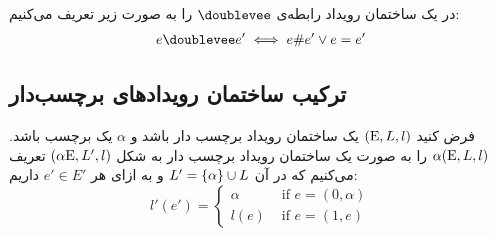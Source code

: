 \begin{definition}
    در یک ساختمان رویداد رابطه‌ی
    $\doublevee$
    را به صورت زیر تعریف می‌کنیم:
    \begin{align*}
        e \doublevee e' \iff e \# e' \vee e = e'
    \end{align*}
\end{definition}

\subsection{ترکیب ساختمان رویداد‌های برچسب‌دار}

\begin{definition}
    فرض کنید
    $(\mathrm{E},L,l)$
    یک ساختمان رویداد برچسب دار باشد و
    $\alpha$
    یک برچسب باشد.
    $\alpha(\mathrm{E},L,l)$
    را به صورت یک ساختمان رویداد برچسب دار به شکل
    $(\alpha \mathrm{E},L',l)$
    تعریف می‌کنیم که در آن
    $L' = \{\alpha\}\cup L$
    و به ازای هر
    $e' \in E'$
    داریم:
    $$
        l'(e') = \begin{cases}
            \alpha & \text{ if } e = (0,\alpha) \\
            l(e)   & \text{ if } e = (1,e)
        \end{cases}
    $$
\end{definition}

